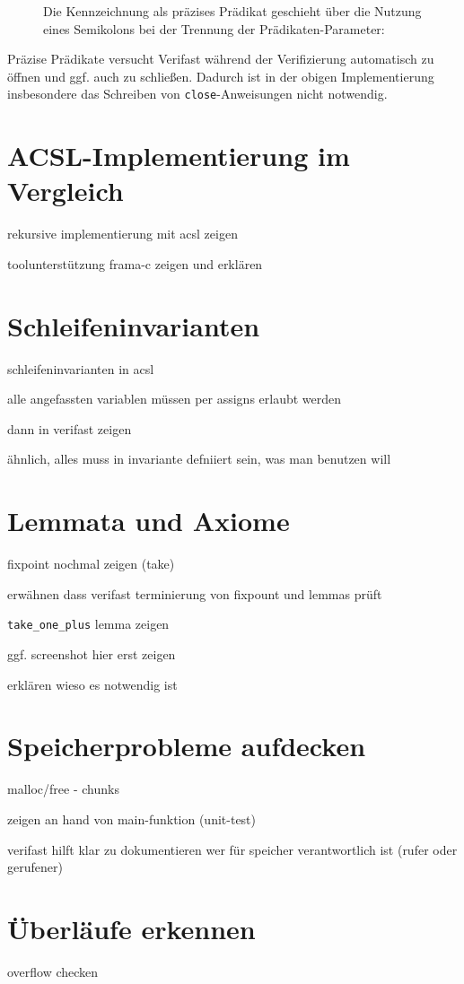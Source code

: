 \begin{figure}[H]
Die Kennzeichnung als präzises Prädikat geschieht über die Nutzung eines Semikolons bei der Trennung
der Prädikaten-Parameter:


\end{figure}

Präzise Prädikate versucht Verifast während der Verifizierung automatisch zu öffnen und ggf. auch zu
schließen. Dadurch ist in der obigen Implementierung insbesondere das Schreiben von \texttt{close}-Anweisungen
nicht notwendig.


\section{ACSL-Implementierung im Vergleich}

rekursive implementierung mit acsl zeigen

toolunterstützung frama-c zeigen und erklären

\section{Schleifeninvarianten}

schleifeninvarianten in acsl

alle angefassten variablen müssen per assigns erlaubt werden

dann in verifast zeigen

ähnlich, alles muss in invariante defniiert sein, was man benutzen will

\section{Lemmata und Axiome}

fixpoint nochmal zeigen (take)

erwähnen dass verifast terminierung von fixpount und lemmas prüft

\lstinline{take_one_plus} lemma zeigen

ggf. screenshot hier erst zeigen

erklären wieso es notwendig ist

\section{Speicherprobleme aufdecken}

malloc/free - chunks

zeigen an hand von main-funktion (unit-test)

verifast hilft klar zu dokumentieren wer für speicher verantwortlich ist (rufer oder gerufener)

\section{Überläufe erkennen}

overflow checken
